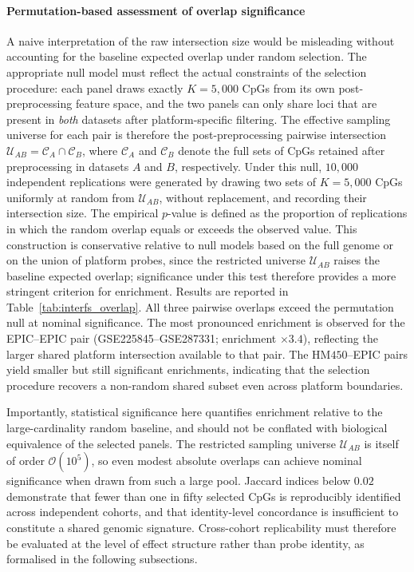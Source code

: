 \paragraph{Permutation-based assessment of overlap significance}
A naive interpretation of the raw intersection size would be
misleading without accounting for the baseline expected overlap
under random selection.
The appropriate null model must reflect the actual constraints of
the selection procedure: each panel draws exactly $K = 5{,}000$
CpGs from its own post-preprocessing feature space, and the two
panels can only share loci that are present in \emph{both} datasets
after platform-specific filtering.
The effective sampling universe for each pair is therefore the
post-preprocessing pairwise intersection $\mathcal{U}_{AB} =
\mathcal{C}_A \cap \mathcal{C}_B$, where $\mathcal{C}_A$ and
$\mathcal{C}_B$ denote the full sets of CpGs retained after
preprocessing in datasets $A$ and $B$, respectively.
Under this null, $10{,}000$ independent replications were generated
by drawing two sets of $K = 5{,}000$ CpGs uniformly at random from
$\mathcal{U}_{AB}$, without replacement, and recording their
intersection size.
The empirical $p$-value is defined as the proportion of replications
in which the random overlap equals or exceeds the observed value.
This construction is conservative relative to null models based on
the full genome or on the union of platform probes, since the
restricted universe $\mathcal{U}_{AB}$ raises the baseline expected
overlap; significance under this test therefore provides a more
stringent criterion for enrichment.
Results are reported in Table~\ref{tab:interfs_overlap}.
All three pairwise overlaps exceed the permutation null at nominal
significance.
The most pronounced enrichment is observed for the EPIC--EPIC pair
(GSE225845--GSE287331; enrichment $\times 3.4$), reflecting the
larger shared platform intersection available to that pair.
The HM$450$--EPIC pairs yield smaller but still significant
enrichments, indicating that the selection procedure recovers a
non-random shared subset even across platform boundaries.

Importantly, statistical significance here quantifies enrichment
relative to the large-cardinality random baseline, and should not
be conflated with biological equivalence of the selected panels.
The restricted sampling universe $\mathcal{U}_{AB}$ is itself of
order $\mathcal{O}(10^5)$, so even modest absolute overlaps can
achieve nominal significance when drawn from such a large pool.
Jaccard indices below $0.02$ demonstrate that fewer than one in
fifty selected CpGs is reproducibly identified across independent
cohorts, and that identity-level concordance is insufficient to
constitute a shared genomic signature.
Cross-cohort replicability must therefore be evaluated at the level
of effect structure rather than probe identity, as formalised in
the following subsections.

